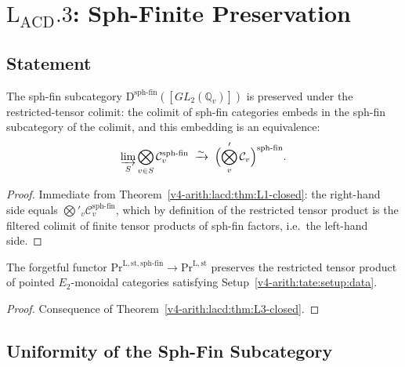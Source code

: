 \section{\(\mathrm{L}_{\mathrm{ACD}}.3\): Sph-Finite Preservation}
\label{v4-arith:lacd:L3}

\subsection{Statement}

\begin{theorem}
\label{v4-arith:lacd:thm:L3-closed}
The sph-fin subcategory
\(\mathrm{D}^{\mathrm{sph\text{-}fin}}([GL_{2}(\mathbb{Q}_{v})])\)
is preserved under the restricted-tensor colimit: the colimit of
sph-fin categories embeds in the sph-fin subcategory of the colimit,
and this embedding is an equivalence:
\begin{equation}
\varinjlim_{S}\bigotimes_{v \in S}\mathcal{C}_{v}^{\mathrm{sph\text{-}fin}}
\;\xrightarrow{\sim}\;
\Bigl(\bigotimes_{v}^{\prime}\mathcal{C}_{v}\Bigr)^{\mathrm{sph\text{-}fin}}.
\end{equation}
\end{theorem}

\begin{proof}
Immediate from Theorem~\ref{v4-arith:lacd:thm:L1-closed}: the right-hand
side equals \(\bigotimes'_{v}\mathcal{C}_{v}^{\mathrm{sph\text{-}fin}}\),
which by definition of the restricted tensor product is the
filtered colimit of finite tensor products of sph-fin factors,
i.e.\ the left-hand side.
\end{proof}

\begin{corollary}
\label{v4-arith:lacd:cor:sph-fin-preserved}
The forgetful functor
\(\mathrm{Pr}^{\mathrm{L,st,sph\text{-}fin}} \to \mathrm{Pr}^{\mathrm{L,st}}\)
preserves the restricted tensor product of pointed \(E_{2}\)-monoidal
categories satisfying
Setup~\ref{v4-arith:tate:setup:data}.
\end{corollary}

\begin{proof}
Consequence of Theorem~\ref{v4-arith:lacd:thm:L3-closed}.
\end{proof}

\subsection{Uniformity of the Sph-Fin Subcategory}

